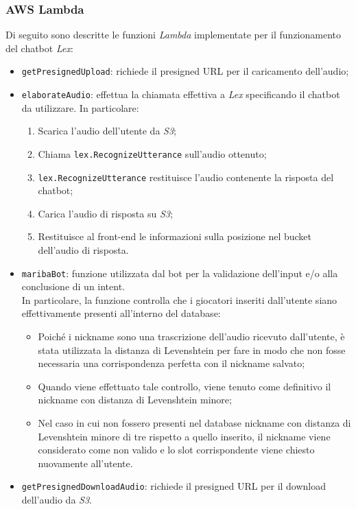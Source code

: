 		\subsubsection{AWS Lambda}
		Di seguito sono descritte le funzioni \emph{Lambda} implementate per il funzionamento del \gls{chatbot} \emph{Lex}:
		\begin{itemize}
			\item \texttt{getPresignedUpload}: richiede il presigned URL per il caricamento dell'audio;
			
			\item \texttt{elaborateAudio}: effettua la chiamata effettiva a \emph{Lex} specificando il \gls{chatbot} da utilizzare. In particolare:
			\begin{enumerate}
				\item Scarica l'audio dell'utente da \emph{S3};
				\item Chiama \texttt{lex.RecognizeUtterance} sull'audio ottenuto;
				\item \texttt{lex.RecognizeUtterance} restituisce l'audio contenente la risposta del \gls{chatbot};
				\item Carica l'audio di risposta su \emph{S3};
				\item Restituisce al front-end le informazioni sulla posizione nel bucket dell'audio di risposta.
			\end{enumerate}
			
			\item \texttt{maribaBot}: funzione utilizzata dal bot per la validazione dell'input e/o alla conclusione di un intent. \\
			In particolare, la funzione controlla che i giocatori inseriti dall'utente siano effettivamente presenti all'interno del database:
			\begin{itemize}
				\item Poiché i nickname sono una trascrizione dell'audio ricevuto dall'utente, è stata utilizzata la 
				\gls{distanza di Levenshtein} per fare in modo che non fosse necessaria una corrispondenza perfetta 
				con il nickname salvato;
				\item Quando viene effettuato tale controllo, viene tenuto come definitivo il nickname con \gls{distanza di Levenshtein} minore;
				\item  Nel caso in cui non fossero presenti nel database nickname con \gls{distanza di Levenshtein} minore di tre rispetto a quello inserito, il nickname viene considerato come non valido e lo slot corrispondente viene chiesto nuovamente all'utente.
			\end{itemize}
		
			\item \texttt{getPresignedDownloadAudio}: richiede il presigned URL per il download dell'audio da \emph{S3}.
			
		\end{itemize}
		
